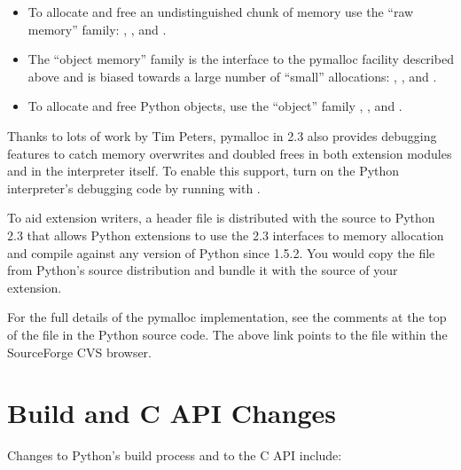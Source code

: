 \documentclass{howto}
\begin{document}
\begin{itemize}
  \item To allocate and free an undistinguished chunk of memory use
  the ``raw memory'' family: ,
  , and .

  \item The ``object memory'' family is the interface to the pymalloc
  facility described above and is biased towards a large number of
  ``small'' allocations: ,
  , and .

  \item To allocate and free Python objects, use the ``object'' family
  , , and
  .
\end{itemize}

Thanks to lots of work by Tim Peters, pymalloc in 2.3 also provides
debugging features to catch memory overwrites and doubled frees in
both extension modules and in the interpreter itself.  To enable this
support, turn on the Python interpreter's debugging code by running
 with .  

To aid extension writers, a header file  is
distributed with the source to Python 2.3 that allows Python
extensions to use the 2.3 interfaces to memory allocation and compile
against any version of Python since 1.5.2.  You would copy the file
from Python's source distribution and bundle it with the source of
your extension.

\begin{seealso}

{For the full details of the pymalloc implementation, see
the comments at the top of the file  in the
Python source code.  The above link points to the file within the
SourceForge CVS browser.}

\end{seealso}


\section{Build and C API Changes}

Changes to Python's build process and to the C API include:
\end{document}
